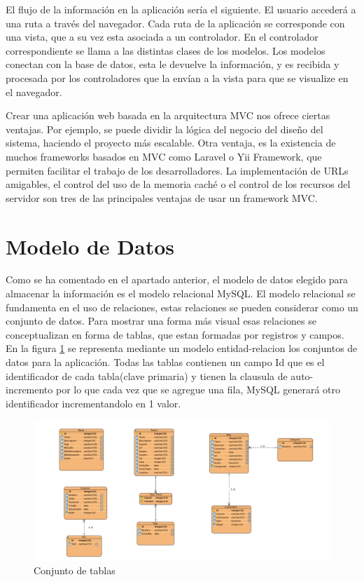  El flujo de la información en la aplicación sería el siguiente. El usuario accederá a una ruta a través del navegador. Cada ruta de la aplicación se corresponde con una vista, que a su vez esta asociada a un controlador. En el controlador correspondiente se llama a las distintas clases de los modelos. Los modelos conectan con la base de datos, esta le devuelve la información, y es recibida y procesada por los controladores que la envían a la vista para que se visualize en el navegador. 



\vspace{5 mm}

Crear una aplicación web basada en la arquitectura MVC nos ofrece ciertas ventajas. Por ejemplo, se puede dividir la lógica del negocio del diseño del sistema, haciendo el proyecto más escalable. Otra ventaja, es la existencia  de muchos frameworks basados en MVC como Laravel o Yii Framework, que permiten facilitar el trabajo de los desarrolladores. La implementación de URLs amigables, el control del uso de la memoria caché o el control de los recursos del servidor son tres de las principales ventajas de usar un framework MVC.


\section{Modelo de Datos}

Como se ha comentado en el apartado anterior, el modelo de datos elegido para almacenar la información es el modelo relacional MySQL. El modelo relacional se fundamenta en el uso de relaciones, estas relaciones se pueden considerar como un conjunto de datos. Para mostrar una forma más visual esas relaciones se conceptualizan en forma de tablas, que estan formadas por registros y campos. En la figura \ref{tablas_bd} se representa mediante un modelo entidad-relacion los conjuntos de datos para la aplicación. Todas las tablas contienen un campo Id que es el identificador de cada tabla(clave primaria) y tienen la clausula de auto-incremento por lo que cada vez que se agregue una fila, MySQL generará otro identificador incrementandolo en 1 valor.


\begin{figure}
\begin{center}
\includegraphics[width=1.0\textwidth]{imagenes/E-R.png}
\caption{Conjunto de tablas}
\label{tablas_bd}
\end{center}
\end{figure}

